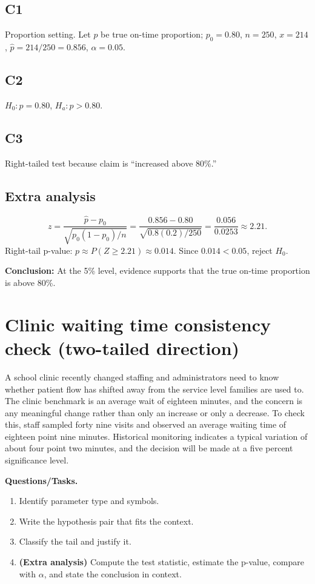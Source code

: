 \subsection*{C1}
Proportion setting. Let \(p\) be true on-time proportion; \(p_0=0.80\), \(n=250\), \(x=214\), \(\hat{p}=214/250=0.856\), \(\alpha=0.05\).

\subsection*{C2}
\(H_0:p=0.80\), \(H_a:p>0.80\).

\subsection*{C3}
Right-tailed test because claim is ``increased above 80\%.'' \RightTailGraph

\subsection*{Extra analysis}
\[
z=\frac{\hat p-p_0}{\sqrt{p_0(1-p_0)/n}}=\frac{0.856-0.80}{\sqrt{0.8(0.2)/250}}=\frac{0.056}{0.0253}\approx 2.21.
\]
Right-tail p-value: \(p\approx P(Z\ge 2.21)\approx 0.014\). Since \(0.014<0.05\), reject \(H_0\).

\textbf{Conclusion:} At the 5\% level, evidence supports that the true on-time proportion is above 80\%.


\section{Clinic waiting time consistency check (two-tailed direction)}
A school clinic recently changed staffing and administrators need to know whether patient flow has shifted away from the service level families are used to. The clinic benchmark is an average wait of eighteen minutes, and the concern is any meaningful change rather than only an increase or only a decrease. To check this, staff sampled forty nine visits and observed an average waiting time of eighteen point nine minutes. Historical monitoring indicates a typical variation of about four point two minutes, and the decision will be made at a five percent significance level.

\textbf{Questions/Tasks.}
\begin{enumerate}
    \item[(C1)] Identify parameter type and symbols.
    \item[(C2)] Write the hypothesis pair that fits the context.
    \item[(C3)] Classify the tail and justify it.
    \item[(EA)] \textbf{(Extra analysis)} Compute the test statistic, estimate the p-value, compare with \(\alpha\), and state the conclusion in context.
\end{enumerate}

